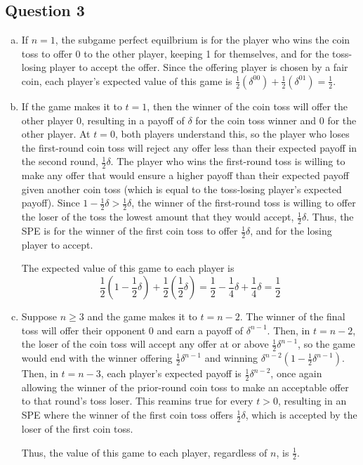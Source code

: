 \documentclass{article}
\begin{document}

\subsection*{Question 3}

\begin{enumerate}[(a)]
	\item If $n=1$, the subgame perfect equilbrium is for the player who wins the coin toss to offer 0 to the other player, keeping 1 for themselves, and for the toss-losing player to accept the offer. Since the offering player is chosen by a fair coin, each player's expected value of this game is ${\frac{1}{2}(\delta^00) + \frac{1}{2}(\delta^01) = \frac{1}{2}}$. 
	
	\item If the game makes it to $t=1$, then the winner of the coin toss will offer the other player 0, resulting in a payoff of $\delta$ for the coin toss winner and 0 for the other player. At $t=0$, both players understand this, so the player who loses the first-round coin toss will reject any offer less than their expected payoff in the second round, ${\frac{1}{2}\delta}$. The player who wins the first-round toss is willing to make any offer that would ensure a higher payoff than their expected payoff given another coin toss (which is equal to the toss-losing player's expected payoff). Since ${1-\frac{1}{2}\delta>\frac{1}{2}\delta}$, the winner of the first-round toss is willing to offer the loser of the toss the lowest amount that they would accept, ${\frac{1}{2}\delta}$. Thus, the SPE is for the winner of the first coin toss to offer $\frac{1}{2}\delta$, and for the losing player to accept.
	
	The expected value of this game to each player is
	\[
		\frac{1}{2}\left(1-\frac{1}{2}\delta\right)+\frac{1}{2}\left(\frac{1}{2}\delta\right) = \frac{1}{2} - \frac{1}{4}\delta + \frac{1}{4}\delta = \frac{1}{2}
	\]
	
	\item Suppose $n\geq 3$ and the game makes it to ${t=n-2}$. The winner of the final toss will offer their opponent 0 and earn a payoff of $\delta^{n-1}$. Then, in ${t=n-2}$, the loser of the coin toss will accept any offer at or above $\frac{1}{2}\delta^{n-1}$, so the game would end with the winner offering ${\frac{1}{2}\delta^{n-1}}$ and winning ${\delta^{n-2}\left(1-\frac{1}{2}\delta^{n-1}\right)}$. Then, in  ${t=n-3}$, each player's expected payoff is $\frac{1}{2}\delta^{n-2}$, once again allowing the winner of the prior-round coin toss to make an acceptable offer to that round's toss loser. This reamins true for every ${t>0}$, resulting in an SPE where the winner of the first coin toss offers $\frac{1}{2}\delta$, which is accepted by the loser of the first coin toss.
	
	Thus, the value of this game to each player, regardless of $n$, is $\frac{1}{2}$.
	
\end{enumerate}
\end{document}
